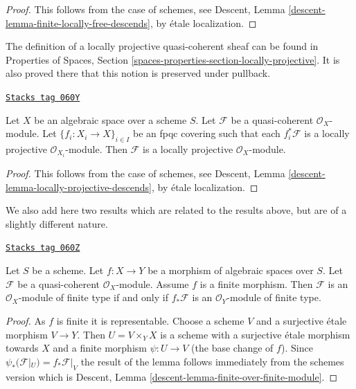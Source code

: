 \begin{proof}
This follows from the case of schemes, see
Descent, Lemma \ref{descent-lemma-finite-locally-free-descends},
by \'etale localization.
\end{proof}

The definition of a locally projective quasi-coherent sheaf can be found in
Properties of Spaces, Section
\ref{spaces-properties-section-locally-projective}.
It is also proved there that this notion is preserved under pullback.

\begin{lemma}
\label{spaces-descent-lemma-locally-projective-descends}
\href{https://stacks.math.columbia.edu/tag/060Y}{\texttt{Stacks tag 060Y}}

Let $X$ be an algebraic space over a scheme $S$.
Let $\mathcal{F}$ be a quasi-coherent $\mathcal{O}_X$-module.
Let $\{f_i : X_i \to X\}_{i \in I}$ be an fpqc covering such that
each $f_i^*\mathcal{F}$ is a locally projective $\mathcal{O}_{X_i}$-module.
Then $\mathcal{F}$ is a locally projective $\mathcal{O}_X$-module.
\end{lemma}

\begin{proof}
This follows from the case of schemes, see
Descent, Lemma \ref{descent-lemma-locally-projective-descends},
by \'etale localization.
\end{proof}

We also add here two results which are related to the results above, but
are of a slightly different nature.

\begin{lemma}
\label{spaces-descent-lemma-finite-over-finite-module}
\href{https://stacks.math.columbia.edu/tag/060Z}{\texttt{Stacks tag 060Z}}

Let $S$ be a scheme.
Let $f : X \to Y$ be a morphism of algebraic spaces over $S$.
Let $\mathcal{F}$ be a quasi-coherent $\mathcal{O}_X$-module.
Assume $f$ is a finite morphism.
Then $\mathcal{F}$ is an $\mathcal{O}_X$-module of finite type
if and only if $f_*\mathcal{F}$ is an $\mathcal{O}_Y$-module of finite
type.
\end{lemma}

\begin{proof}
As $f$ is finite it is representable. Choose a scheme $V$ and a surjective
\'etale morphism $V \to Y$. Then $U = V \times_Y X$ is a scheme with
a surjective \'etale morphism towards $X$ and a finite morphism
$\psi : U \to V$ (the base change of $f$). Since
$\psi_*(\mathcal{F}|_U) = f_*\mathcal{F}|_V$
the result of the lemma follows immediately from the schemes version which
is
Descent, Lemma \ref{descent-lemma-finite-over-finite-module}.
\end{proof}


